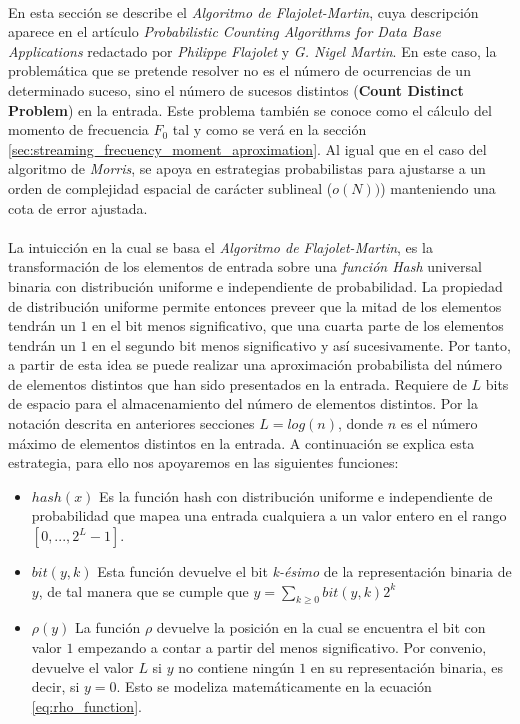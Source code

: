 \documentclass{subfiles}
\begin{document}
      \paragraph{}
      En esta sección se describe el \emph{Algoritmo de Flajolet-Martin}, cuya descripción aparece en el artículo \emph{Probabilistic Counting Algorithms for Data Base Applications} \cite{flajolet1985probabilistic} redactado por \emph{Philippe Flajolet} y \emph{G. Nigel Martin}. En este caso, la problemática que se pretende resolver no es el número de ocurrencias de un determinado suceso, sino el número de sucesos distintos (\textbf{Count Distinct Problem}) en la entrada. Este problema también se conoce como el cálculo del momento de frecuencia $F_0$ tal y como se verá en la sección \ref{sec:streaming_frecuency_moment_aproximation}. Al igual que en el caso del algoritmo de \emph{Morris}, se apoya en estrategias probabilistas para ajustarse a un orden de complejidad espacial de carácter sublineal ($o(N))$) manteniendo una cota de error ajustada.

      \paragraph{}
      La intuicción en la cual se basa el \emph{Algoritmo de Flajolet-Martin}, es la transformación de los elementos de entrada sobre una \emph{función Hash} universal binaria con distribución uniforme e independiente de probabilidad. La propiedad de distribución uniforme permite entonces preveer que la mitad de los elementos tendrán un $1$ en el bit menos significativo, que una cuarta parte de los elementos tendrán un $1$ en el segundo bit menos significativo y así sucesivamente. Por tanto, a partir de esta idea se puede realizar una aproximación probabilista del número de elementos distintos que han sido presentados en la entrada. Requiere de $L$ bits de espacio para el almacenamiento del número de elementos distintos. Por la notación descrita en anteriores secciones $L = log(n)$, donde $n$ es el número máximo de elementos distintos en la entrada. A continuación se explica esta estrategia, para ello nos apoyaremos en las siguientes funciones:

      \begin{itemize}
        \item $hash(x)$ Es la función hash con distribución uniforme e independiente de probabilidad que mapea una entrada cualquiera a un valor entero en el rango $[0,...,2^L-1]$.
        \item $bit(y, k)$ Esta función devuelve el bit \emph{k-ésimo} de la representación binaria de $y$, de tal manera que se cumple que $y = \sum_{k \geq 0} bit(y,k)2^k$
        \item $\rho(y)$ La función $\rho$ devuelve la posición en la cual se encuentra el bit con valor $1$ empezando a contar a partir del menos significativo. Por convenio, devuelve el valor $L$ si $y$ no contiene ningún $1$ en su representación binaria, es decir, si $y = 0$. Esto se modeliza matemáticamente en la ecuación \eqref{eq:rho_function}.
      \end{itemize}
\end{document}
